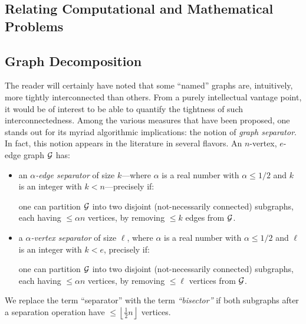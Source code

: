 \subsection{Relating Computational and Mathematical Problems}
\label{sec:Relate-CS-Math-Probs}

\subsection{Graph Decomposition}
\label{sec:graph-decompose}

The reader will certainly have noted that some ``named'' graphs are, intuitively, more 
tightly interconnected than others.  From a purely intellectual vantage point, it would 
be of interest to be able to quantify the tightness of such interconnectedness.  Among 
the various measures that have been proposed, one stands out for its myriad algorithmic
implications: the notion of {\it graph separator}.  In fact, this notion appears in the literature 
in several flavors.  An $n$-vertex, $e$-edge graph $\mbox{$\cal G$}$ has:
\begin{itemize}
\item
an {\it $\alpha$-edge separator} of size $k$---where $\alpha$ is a real number with $\alpha \leq 1/2$ 
and $k$ is an integer with $k < n$---precisely if:

\smallskip

one can partition $\mbox{$\cal G$}$ into two disjoint (not-necessarily connected) subgraphs, each having 
$\leq \alpha n$ vertices, by removing $\leq k$ edges from $\mbox{$\cal G$}$.

\item
a {\it $\alpha$-vertex separator} of size $\ell$, where $\alpha$ is a real number with 
$\alpha \leq 1/2$ and $\ell$ is an integer with $k < e$, precisely if:

\smallskip

one can partition $\mbox{$\cal G$}$ into two disjoint (not-necessarily connected) subgraphs, each having
$\leq \alpha n$ vertices, by removing $\leq \ell$ vertices from $\mbox{$\cal G$}$.
\end{itemize}
We replace the term ``separator'' with the term {\em ``bisector''}  if both subgraphs after a 
separation operation have $\leq \left\lfloor \frac{1}{2} n \right\rfloor$ vertices.
 

\medskip

